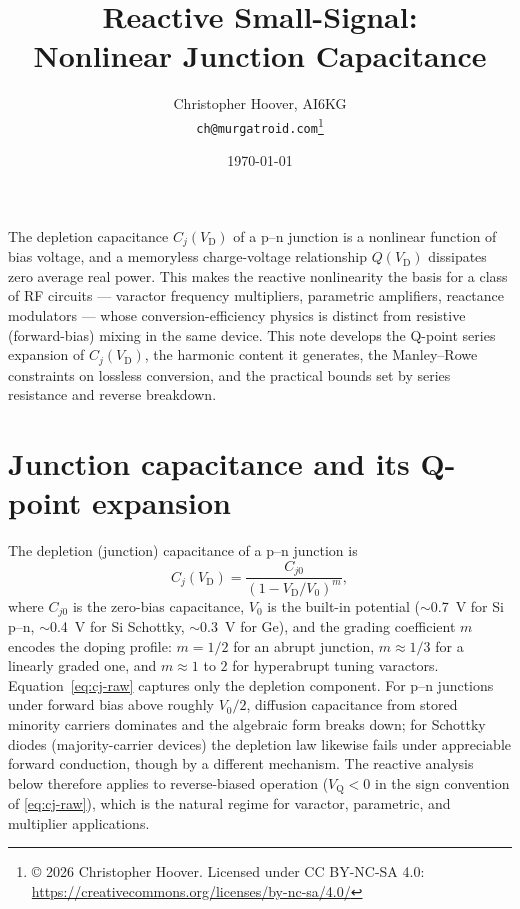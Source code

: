 \documentclass[12pt]{article}
\title{Reactive Small-Signal:\\ Nonlinear Junction Capacitance}
\author{Christopher Hoover, AI6KG \\ \texttt{ch@murgatroid.com}\thanks{\copyright{} 2026 Christopher Hoover. Licensed under CC BY-NC-SA 4.0: \url{https://creativecommons.org/licenses/by-nc-sa/4.0/}}}
\date{\today}
\newcommand{\VD}{V_{\mathrm{D}}}
\newcommand{\VQ}{V_{\mathrm{Q}}}
\begin{document}
\maketitle

The depletion capacitance $C_j(\VD)$ of a p--n junction is a nonlinear function of bias voltage, and a memoryless charge-voltage relationship $Q(\VD)$ dissipates zero average real power. This makes the reactive nonlinearity the basis for a class of RF circuits --- varactor frequency multipliers, parametric amplifiers, reactance modulators --- whose conversion-efficiency physics is distinct from resistive (forward-bias) mixing in the same device. This note develops the Q-point series expansion of $C_j(\VD)$, the harmonic content it generates, the Manley--Rowe constraints on lossless conversion, and the practical bounds set by series resistance and reverse breakdown.

\section*{Junction capacitance and its Q-point expansion}

The depletion (junction) capacitance of a p--n junction is \cite{sze}
\begin{equation}
C_j(\VD) = \frac{C_{j0}}{\left(1 - \VD/V_0\right)^m},
\label{eq:cj-raw}
\end{equation}
where $C_{j0}$ is the zero-bias capacitance, $V_0$ is the built-in potential ($\sim$\SI{0.7}{\volt} for Si p--n, $\sim$\SI{0.4}{\volt} for Si Schottky, $\sim$\SI{0.3}{\volt} for Ge), and the grading coefficient $m$ encodes the doping profile: $m = 1/2$ for an abrupt junction, $m \approx 1/3$ for a linearly graded one, and $m \approx 1$ to $2$ for hyperabrupt tuning varactors. Equation~\eqref{eq:cj-raw} captures only the depletion component. For p--n junctions under forward bias above roughly $V_0/2$, diffusion capacitance from stored minority carriers dominates and the algebraic form breaks down; for Schottky diodes (majority-carrier devices) the depletion law likewise fails under appreciable forward conduction, though by a different mechanism. The reactive analysis below therefore applies to reverse-biased operation ($\VQ < 0$ in the sign convention of \eqref{eq:cj-raw}), which is the natural regime for varactor, parametric, and multiplier applications.
\end{document}
